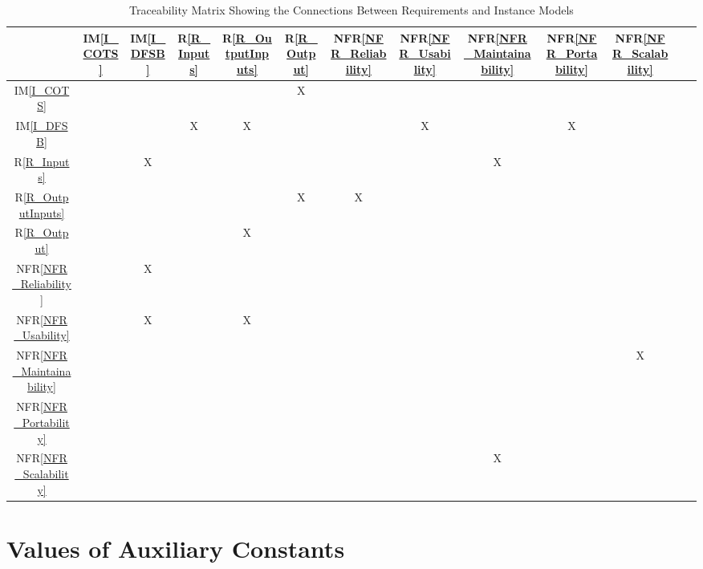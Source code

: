 \documentclass[12pt]{article}
\newcommand{\iref}[1]{IM\ref{#1}}
\newcommand{\rref}[1]{R\ref{#1}}
\newcommand{\nfrref}[1]{NFR\ref{#1}}
\begin{document}
\newpage
\begin{table}[H]
\centering
\begin{tabular}{|c|c|c|c|c|c|c|c|c|c|c|c|c|}
\hline
	& \iref{I_COTS} & \iref{I_DFSB} & \rref{R_Inputs} & \rref{R_OutputInputs}  & \rref{R_Output} & \nfrref{NFR_Reliability} & \nfrref{NFR_Usability} & \nfrref{NFR_Maintainability} & \nfrref{NFR_Portability} & \nfrref{NFR_Scalability} \\

\hline
\iref{I_COTS}         & & & & & X & & & & & \\ \hline
\iref{I_DFSB}         & & & X & X & & & X & & X &\\  \hline
\rref{R_Inputs}     & & X & & & & & & X & & \\ \hline
\rref{R_OutputInputs} & & & & & X & X & & & & \\ \hline
\rref{R_Output} & & & & X & & & & & & \\ \hline
\nfrref{NFR_Reliability}   & & X & & & & & & & & \\ \hline
\nfrref{NFR_Usability}   & & X & & X & & & & & & \\ \hline
\nfrref{NFR_Maintainability}   & & & & & & & & & & X \\ \hline
\nfrref{NFR_Portability}   & & & & & & & & & & \\ \hline
\nfrref{NFR_Scalability}   & & & & & & & & X & & \\
\hline
\end{tabular}
\caption{Traceability Matrix Showing the Connections Between Requirements and Instance Models}
\label{Table:R_trace}
\end{table}


\newpage
\section{Values of Auxiliary Constants}
\end{document}
